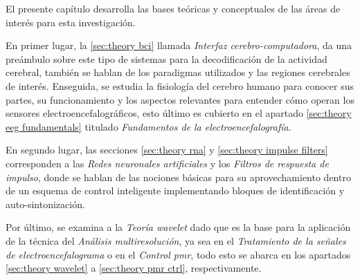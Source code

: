 \label{chap:theory}

El presente capítulo desarrolla las bases teóricas y conceptuales de las áreas de interés para esta investigación.

En primer lugar, la \cref{sec:theory bci} llamada \textit{Interfaz cerebro-computadora}, da una preámbulo sobre este tipo de sistemas para la decodificación de la actividad cerebral, también se hablan de los paradigmas utilizados y las regiones cerebrales de interés. Enseguida, se estudia la fisiología del cerebro humano para conocer sus partes, su funcionamiento y los aspectos relevantes para entender cómo operan los sensores electroencefalográficos, esto último es cubierto en el apartado \ref{sec:theory eeg fundamentals} titulado \textit{Fundamentos de la electroencefalografía}. 

En segundo lugar, las secciones \ref{sec:theory rna} y \ref{sec:theory impulse filters} corresponden a las \textit{Redes neuronales artificiales} y los \textit{Filtros de respuesta de impulso}, donde se hablan de las nociones básicas para su aprovechamiento dentro de un esquema de control inteligente implementando bloques de identificación y auto-sintonización.

Por último, se examina a la \textit{Teoría wavelet} dado que es la base para la aplicación de la técnica del \textit{Análisis multiresolución}, ya sea en el \textit{Tratamiento de la señales de electroencefalograma} o en el \textit{Control \acrlong{pmr}}, todo esto se abarca en los apartados \ref{sec:theory wavelet} a \ref{sec:theory pmr ctrl}, respectivamente.

        
        
